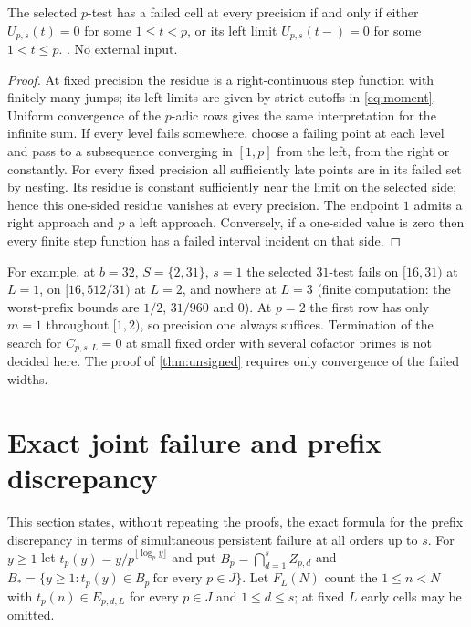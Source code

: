 \documentclass[11pt]{article}
\begin{document}
\begin{proposition}\label{prop:sides}
The selected $p$-test has a failed cell at every precision if and only if either $U_{p,s}(t)=0$ for some $1\le t<p$, or its left limit $U_{p,s}(t-)=0$ for some $1<t\le p$. . No external input.
\end{proposition}
\begin{proof}
At fixed precision the residue is a right-continuous step function with finitely many jumps; its left limits are given by strict cutoffs in \eqref{eq:moment}. Uniform convergence of the $p$-adic rows gives the same interpretation for the infinite sum. If every level fails somewhere, choose a failing point at each level and pass to a subsequence converging in $[1,p]$ from the left, from the right or constantly. For every fixed precision all sufficiently late points are in its failed set by nesting. Its residue is constant sufficiently near the limit on the selected side; hence this one-sided residue vanishes at every precision. The endpoint $1$ admits a right approach and $p$ a left approach. Conversely, if a one-sided value is zero then every finite step function has a failed interval incident on that side.
\end{proof}
For example, at $b=32$, $S=\{2,31\}$, $s=1$ the selected $31$-test fails on $[16,31)$ at $L=1$, on $[16,512/31)$ at $L=2$, and nowhere at $L=3$ (finite computation: the worst-prefix bounds are $1/2$, $31/960$ and $0$). At $p=2$ the first row has only $m=1$ throughout $[1,2)$, so precision one always suffices. Termination of the search for $C_{p,s,L}=0$ at small fixed order with several cofactor primes is not decided here. The proof of \cref{thm:unsigned} requires only convergence of the failed widths.

\section{Exact joint failure and prefix discrepancy}\label{sec:joint}
This section states, without repeating the proofs, the exact formula for the prefix discrepancy in terms of simultaneous persistent failure at all orders up to $s$. For $y\ge1$ let $t_p(y)=y/p^{\lfloor\log_py\rfloor}$ and put $B_p=\bigcap_{d=1}^sZ_{p,d}$ and $B_*=\{y\ge1:t_p(y)\in B_p\ \text{for every }p\in J\}$. Let $F_L(N)$ count the $1\le n<N$ with $t_p(n)\in E_{p,d,L}$ for every $p\in J$ and $1\le d\le s$; at fixed $L$ early cells may be omitted.
\end{document}
